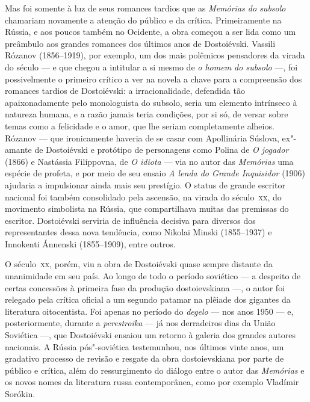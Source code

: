 Mas foi somente à luz de seus romances tardios que as \textit{Memórias do
subsolo} chamariam novamente a atenção do público e da crítica.  Primeiramente
na Rússia, e aos poucos também no Ocidente, a obra começou a ser lida como um
preâmbulo aos grandes romances dos últimos anos de Dostoiévski. Vassili Rózanov
(1856--1919), por exemplo, um dos mais polêmicos pensadores da virada do século
--- e que chegou a intitular a si mesmo de \textit{o homem do subsolo} ---, foi
possivelmente o primeiro crítico a ver na novela a chave para a compreensão dos
romances tardios de Dostoiévski: a irracionalidade, defendida tão
apaixonadamente pelo monologuista do subsolo, seria um elemento
intrínseco à natureza humana, e a razão jamais teria condições, por si só, de
versar sobre temas como a felicidade e o amor, que lhe seriam completamente
alheios. Rózanov --- que ironicamente haveria de se casar com Apollinária
Súslova, ex"-amante de Dostoiévski e protótipo de personagens como Polina de
\textit{O jogador} (1866) e Nastássia Filíppovna, de \textit{O idiota} --- via no
autor das \textit{Memórias} uma espécie de profeta, e por meio de seu ensaio \textit{A
lenda do Grande Inquisidor} (1906) ajudaria a impulsionar ainda mais seu
prestígio. O status de grande escritor nacional foi também consolidado pela
ascensão, na virada do século~\textsc{xx}, do movimento simbolista na Rússia, que
compartilhava muitas das premissas do escritor. Dostoiévski serviria de
influência decisiva para diversos dos representantes dessa nova tendência, como
Nikolai Minski (1855--1937) e Innokenti Ánnenski (1855--1909), entre outros.

O século~\textsc{xx}, porém, viu a obra de Dostoiévski quase sempre distante da
unanimidade em seu país. Ao longo de todo o período soviético --- a despeito de
certas concessões à primeira fase da produção dostoievskiana ---, o autor foi
relegado pela crítica oficial a um segundo patamar na plêiade dos gigantes da
literatura oitocentista. Foi apenas no período do \textit{degelo} --- nos anos
1950 --- e, posteriormente, durante a \textit{perestroika} --- já nos derradeiros
dias da União Soviética ---, que Dostoiévski ensaiou um retorno à galeria dos
grandes autores nacionais. A Rússia pós"-soviética testemunhou, nos últimos
vinte anos, um gradativo processo de revisão e resgate da obra dostoievskiana
por parte de público e crítica, além do ressurgimento do diálogo entre o autor
das \textit{Memórias} e os novos nomes da literatura russa contemporânea, como
por exemplo Vladímir Sorókin.

